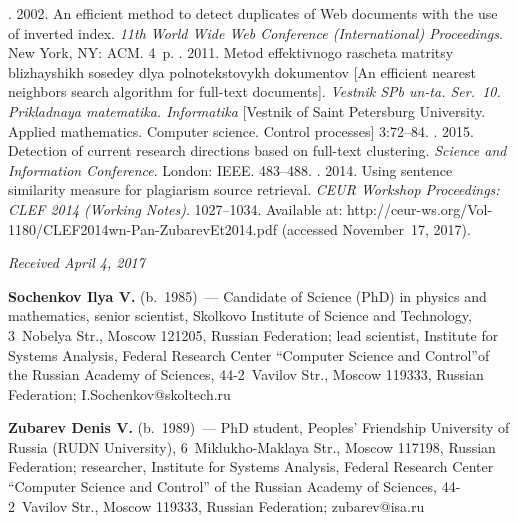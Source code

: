 \begin{multicols}{2}
{{\begin{thebibliography}{99}
. 2002. An 
efficient method to detect duplicates of Web documents with the use of inverted 
index. \textit{11th  World Wide Web Conference (International) Proceedings}. 
New York, NY: ACM. 4~p.
. 2011. Metod effektivnogo rascheta 
matritsy blizhayshikh sosedey dlya polnotekstovykh dokumentov [An efficient 
nearest neighbors search algorithm for full-text documents]. \textit{Vestnik 
SPb un-ta. Ser.~10. Prikladnaya matematika. Informatika} [Vestnik 
of Saint Petersburg University. Applied mathematics. Computer science. 
Control processes] 3:72--84.
. 2015. Detection of current research directions based on full-text 
clustering. \textit{Science and Information Conference}. London: IEEE. 483--488.
. 2014. Using sentence similarity 
measure for plagiarism source retrieval. \textit{CEUR Workshop Proceedings: 
CLEF 2014 (Working Notes)}. 1027--1034. Available at: {\sf  
http://ceur-ws.org/Vol-1180/CLEF2014wn-Pan-ZubarevEt2014.pdf} (accessed 
November~17, 2017).

\end{thebibliography}

 }
 }

\end{multicols}

\vspace*{-6pt}

\hfill{\small\textit{Received April 4, 2017}}


\Contr

\noindent
\textbf{Sochenkov Ilya V.} (b.\ 1985)~--- Candidate of Science (PhD) in physics 
and mathematics, senior scientist, Skolkovo Institute of Science and Technology,
3~Nobelya Str., Moscow 121205, Russian Federation;
lead scientist, Institute for Systems Analysis, Federal Research Center 
``Computer Science and Control''of the Russian Academy of Sciences, 44-2~Vavilov 
Str., Moscow 119333, Russian Federation; \mbox{I.Sochenkov@skoltech.ru}

\vspace*{3pt}


\noindent
\textbf{Zubarev Denis  V.} (b.\ 1989)~--- PhD student, Peoples' Friendship 
University of Russia (RUDN University), 6~Miklukho-Maklaya Str., Moscow 117198, 
Russian Federation; researcher, Institute for Systems Analysis, Federal Research 
Center ``Computer Science and Control'' of the Russian Academy of Sciences, 
44-2~Vavilov Str., Moscow 119333, Russian Federation; \mbox{zubarev@isa.ru}

